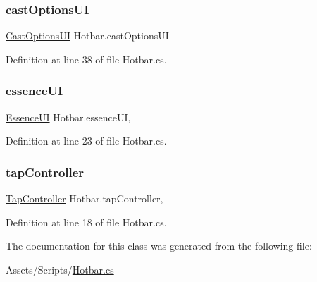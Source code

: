 \mbox{\label{class_hotbar_a5712a8564c6cdbae01f3900648ce9fae}} 
\subsubsection{\texorpdfstring{castOptionsUI}{castOptionsUI}}
{\footnotesize\ttfamily \mbox{\hyperlink{class_cast_options_u_i}{Cast\+Options\+UI}} Hotbar.\+cast\+Options\+UI\hspace{0.3cm}{\ttfamily [get]}}



Definition at line 38 of file Hotbar.\+cs.

\mbox{\label{class_hotbar_a02baa28776d8464929571a32904d78a5}} 
\subsubsection{\texorpdfstring{essenceUI}{essenceUI}}
{\footnotesize\ttfamily \mbox{\hyperlink{class_essence_u_i}{Essence\+UI}} Hotbar.\+essence\+UI\hspace{0.3cm}{\ttfamily [get]}, {\ttfamily [set]}}



Definition at line 23 of file Hotbar.\+cs.

\mbox{\label{class_hotbar_a0281562a5bf5e3224f4d88f090bf3a84}} 
\subsubsection{\texorpdfstring{tapController}{tapController}}
{\footnotesize\ttfamily \mbox{\hyperlink{class_tap_controller}{Tap\+Controller}} Hotbar.\+tap\+Controller\hspace{0.3cm}{\ttfamily [get]}, {\ttfamily [set]}}



Definition at line 18 of file Hotbar.\+cs.



The documentation for this class was generated from the following file\+:\begin{DoxyCompactItemize}
\item 
Assets/\+Scripts/\mbox{\hyperlink{_hotbar_8cs}{Hotbar.\+cs}}\end{DoxyCompactItemize}
